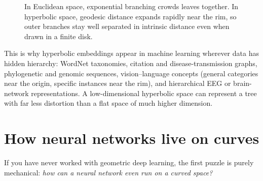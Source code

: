 \begin{figure}[htbp]
\caption{In Euclidean space, exponential branching crowds leaves together. In hyperbolic space, geodesic distance expands rapidly near the rim, so outer branches stay well separated in intrinsic distance even when drawn in a finite disk.}
\label{fig:N20261121-tree-crowding}
\end{figure}

This is why hyperbolic embeddings appear in machine learning wherever data has hidden hierarchy: WordNet taxonomies, citation and disease-transmission graphs, phylogenetic and genomic sequences, vision--language concepts (general categories near the origin, specific instances near the rim), and hierarchical EEG or brain-network representations. A low-dimensional hyperbolic space can represent a tree with far less distortion than a flat space of much higher dimension.

\section{How neural networks live on curves}

If you have never worked with geometric deep learning, the first puzzle is purely mechanical: \emph{how can a neural network even run on a curved space?}

